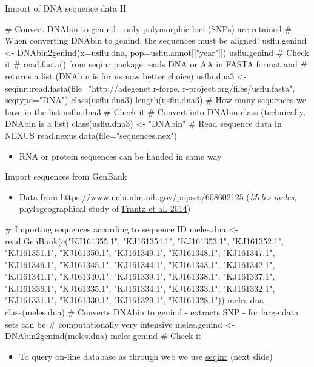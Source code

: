 \documentclass[compress, ucs, xelatex, 11pt, xcolor=svgnames,
	hyperref={
		bookmarks=true,
		unicode=true,
		colorlinks=true,
		pdftitle={Molecular data in R},
		plainpages=false,
		pdfauthor={Vojtech Zeisek},
		pdfsubject={Course about phylogeny and evolution in R},
		pdfcreator={XeLaTeX},
		pdfkeywords={R, evolution, phylogeny, molecular data},
		linkcolor=Tomato,
		anchorcolor=SaddleBrown,
		citecolor=Goldenrod,
		filecolor=DarkMagenta,
		menucolor=Sienna,
		urlcolor=DarkTurquoise,
		pdftex},
	url={hyphens, lowtilde} %
	]{beamer}
\begin{document}
\begin{frame}[fragile]{Import of DNA sequence data II}
	\begin{spluscode}
    # Convert DNAbin to genind - only polymorphic loci (SNPs) are retained
    # When converting DNAbin to genind, the sequences must be aligned!
    usflu.genind <- DNAbin2genind(x=usflu.dna, pop=usflu.annot[["year"]])
    usflu.genind # Check it
    # read.fasta() from seqinr package reads DNA or AA in FASTA format and
    # returns a list (DNAbin is for us now better choice)
    usflu.dna3 <- seqinr::read.fasta(file="http://adegenet.r-forge.
      r-project.org/files/usflu.fasta", seqtype="DNA")
    class(usflu.dna3)
    length(usflu.dna3) # How many sequences we have in the list
    usflu.dna3 # Check it
    # Convert into DNAbin class (technically, DNAbin is a list)
    class(usflu.dna3) <- "DNAbin"
    # Read sequence data in NEXUS
    read.nexus.data(file="sequences.nex")
	\end{spluscode}
	\begin{itemize}
		\item RNA or protein sequences can be handed in same way
	\end{itemize}
\end{frame}

\begin{frame}[fragile]{Import sequences from GenBank}
	\begin{itemize}
		\item Data from \url{https://www.ncbi.nlm.nih.gov/popset/608602125} (\textit{Meles meles}, phylogeographical study of \href{https://www.nature.com/articles/hdy201445}{Frantz et al. 2014})
	\end{itemize}
	\begin{spluscode}
    # Importing sequences according to sequence ID
    meles.dna <- read.GenBank(c("KJ161355.1", "KJ161354.1", "KJ161353.1",
      "KJ161352.1", "KJ161351.1", "KJ161350.1", "KJ161349.1", "KJ161348.1",
      "KJ161347.1", "KJ161346.1", "KJ161345.1", "KJ161344.1", "KJ161343.1",
      "KJ161342.1", "KJ161341.1", "KJ161340.1", "KJ161339.1", "KJ161338.1",
      "KJ161337.1", "KJ161336.1", "KJ161335.1", "KJ161334.1", "KJ161333.1",
      "KJ161332.1", "KJ161331.1", "KJ161330.1", "KJ161329.1", "KJ161328.1"))
    meles.dna
    class(meles.dna)
    # Converts DNAbin to genind - extracts SNP - for large data sets can be
    # computationally very intensive
    meles.genind <- DNAbin2genind(meles.dna)
    meles.genind # Check it
	\end{spluscode}
	\begin{itemize}
		\item To query on-line database as through web we use \href{https://CRAN.R-project.org/package=seqinr}{seqinr} (next slide)
	\end{itemize}
\end{frame}
\end{document}
